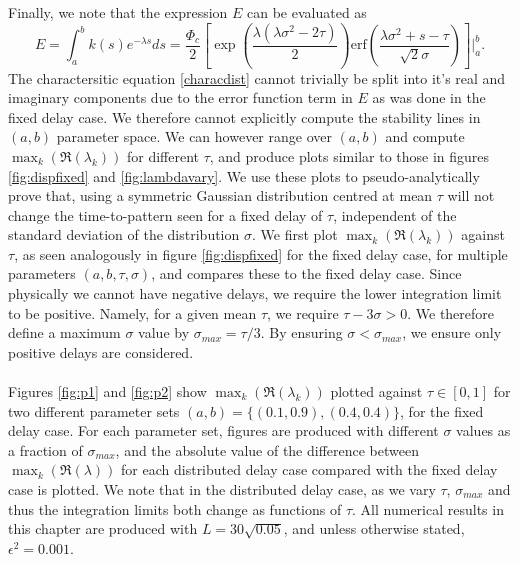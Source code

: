 Finally, we note that the expression $E$ can be evaluated as
\begin{equation}
E=\int_a^bk(s)e^{-\lambda s}ds=\frac{\Phi_c}{2}\left[\exp\left(\frac{\lambda(\lambda\sigma^2-2\tau)}{2}\right) \text{erf} \left(\frac{\lambda\sigma^2+s-\tau}{\sqrt{2}\sigma}\right)\right]\Bigg|_a^b.
\end{equation}
The charactersitic equation \eqref{characdist} cannot trivially be split into it's real and imaginary components due to the error function term in $E$ as was done in the fixed delay case. We therefore cannot explicitly compute the stability lines in $(a,b)$ parameter space. We can however range over $(a,b)$ and compute $\max_k(\Re(\lambda_k))$ for different $\tau$, and produce plots similar to those in figures \ref{fig:dispfixed} and \ref{fig:lambdavary}. We use these plots to pseudo-analytically prove that, using a symmetric Gaussian distribution centred at mean $\tau$ will not change the time-to-pattern seen for a fixed delay of $\tau$, independent of the standard deviation of the distribution $\sigma$. We first plot $\max_k(\Re(\lambda_k))$ against $\tau$, as seen analogously in figure \ref{fig:dispfixed} for the fixed delay case, for multiple parameters $(a,b,\tau,\sigma)$, and compares these to the fixed delay case. Since physically we cannot have negative delays, we require the lower integration limit to be positive. Namely, for a given mean $\tau$, we require $\tau-3\sigma>0$. We therefore define a maximum $\sigma$ value by $\sigma_{max}=\tau / 3$. By ensuring $\sigma<\sigma_{max}$, we ensure only positive delays are considered.
\\\\
Figures \ref{fig:p1} and \ref{fig:p2} show $\max_k(\Re(\lambda_k))$ plotted against $\tau\in[0,1]$ for two different parameter sets $(a,b)=\{(0.1,0.9), (0.4,0.4)\}$, for the fixed delay case. For each parameter set, figures are produced with different $\sigma$ values as a fraction of $\sigma_{max}$, and the absolute value of the difference between $\max_k(\Re(\lambda))$ for each distributed delay case compared with the fixed delay case is plotted. We note that in the distributed delay case, as we vary $\tau$, $\sigma_{max}$ and thus the integration limits both change as functions of $\tau$. All numerical results in this chapter are produced with $L=30\sqrt{0.05}$, and unless otherwise stated, $\epsilon^2=0.001$.

